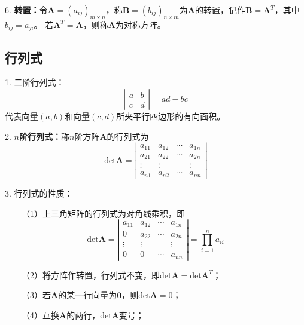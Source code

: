 6. \textbf{转置：}令$\boldsymbol{A}=(a_{ij})_{m\times n}$，称$\boldsymbol{B}=(b_{ij})_{n\times m}$为$\boldsymbol{A}$的转置，记作$\boldsymbol{B}=\boldsymbol{A}^T$，其中$b_{ij}=a_{ji}$。
若$\boldsymbol{A}^T=\boldsymbol{A}$，则称$\boldsymbol{A}$为对称方阵。

\subsection{行列式}

1. 二阶行列式：
\begin{equation*}
    \left|\begin{matrix}
        a&b\\
        c&d
    \end{matrix}\right|=ad-bc
\end{equation*}
代表向量$(a,b)$和向量$(c,d)$所夹平行四边形的有向面积。

2. \textbf{$n$阶行列式：}称$n$阶方阵$\boldsymbol{A}$的行列式为
\begin{equation*}
    \text{det}\boldsymbol{A}=\left|\begin{matrix}
        a_{11}&a_{12}&\cdots&a_{1n}\\
        a_{21}&a_{22}&\cdots&a_{2n}\\
        \vdots&\vdots&&\vdots\\
        a_{n1}&a_{n2}&\cdots&a_{nn}
    \end{matrix}\right|
\end{equation*}

3. 行列式的性质：

~~~~（1）上三角矩阵的行列式为对角线乘积，即
\begin{equation*}
    \text{det}\boldsymbol{A}=\left|\begin{matrix}
        a_{11}&a_{12}&\cdots&a_{1n}\\
        0&a_{22}&\cdots&a_{2n}\\
        \vdots&\vdots&&\vdots\\
        0&0&\cdots&a_{nn}
    \end{matrix}\right|=\prod\limits_{i=1}^n a_{ii}
\end{equation*}

~~~~（2）将方阵作转置，行列式不变，即det$\boldsymbol{A}=$det$\boldsymbol{A}^T$；

~~~~（3）若$\boldsymbol{A}$的某一行向量为$\boldsymbol{0}$，则det$\boldsymbol{A}=0$；

~~~~（4）互换$\boldsymbol{A}$的两行，det$\boldsymbol{A}$变号；

